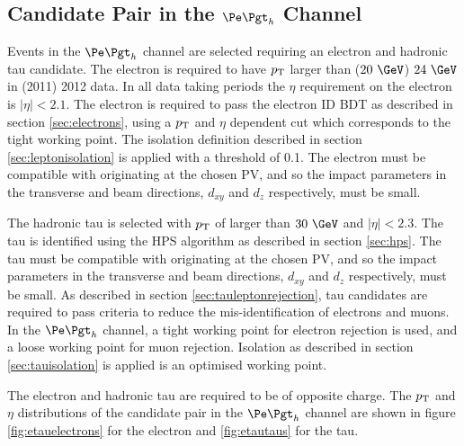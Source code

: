 \subsection{Candidate Pair in the $\etau$ Channel}

Events in the $\etau$ channel are selected requiring an electron and hadronic tau
candidate. The electron is required to have $p_{\mathrm{T}}$ larger than ($20~\GeV$)
$24~\GeV$ in (2011) 2012 data. In all data taking periods the $\eta$ requirement
on the electron is $|\eta| < 2.1$. The electron is required to pass the electron
ID \ac{BDT} as described in section \ref{sec:electrons}, using a $p_{\mathrm{T}}$ and
$\eta$ dependent cut which corresponds to the tight working point.  
The isolation definition described in section \ref{sec:leptonisolation} is
applied with a threshold of 0.1. The electron must be compatible with
originating at the chosen \ac{PV}, and so the impact parameters in the
transverse and beam directions, $d_{xy}$ and $d_{z}$ respectively, must be
small. 

The hadronic tau is selected with $p_{\mathrm{T}}$ of larger than $30~\GeV$ and
$|\eta|<2.3$. The tau is identified using the \ac{HPS} algorithm as described in 
section \ref{sec:hps}. The tau must be compatible with
originating at the chosen \ac{PV}, and so the impact parameters in the
transverse and beam directions, $d_{xy}$ and $d_{z}$ respectively, must be
small. As described in section \ref{sec:tauleptonrejection}, tau candidates are
required to pass criteria to reduce the mis-identification of electrons and
muons. In the $\etau$ channel, a tight working point for electron rejection is
used, and a loose working point for muon rejection. Isolation as described in
section \ref{sec:tauisolation} is applied is an optimised working point.  


The electron and hadronic tau are required to be of opposite charge. 
The $p_{\mathrm{T}}$ and $\eta$ distributions of the candidate pair in the
$\etau$ channel are shown in figure \ref{fig:etauelectrons} for the electron and
\ref{fig:etautaus} for the tau. 


